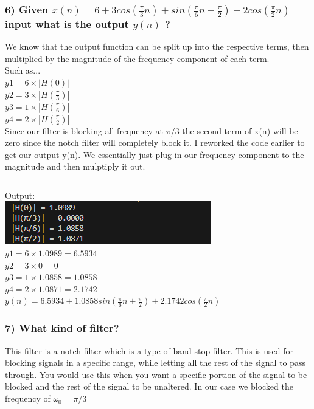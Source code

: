 \documentclass[12pt,letterpaper]{article}
\begin{document}
\subsubsection*{6) Given $x(n) = 6 + 3 cos(\frac{\pi}{3}n) + sin(\frac{\pi}{6}n + \frac{\pi}{2}) + 2 cos(\frac{\pi}{2}n)$  input what is the output $y(n)$ ? }
We know that the output function can be split up into the respective terms, then multiplied by the magnitude of the frequency component of each term.\\
Such as...\\
$y1 = 6 \times |H(0)|$ \\
$y2 = 3 \times |H(\frac{\pi}{3})|$ \\
$y3 = 1 \times |H(\frac{\pi}{6})|$ \\ 
$y4 = 2 \times |H(\frac{\pi}{2})|$ \\
Since our filter is blocking all frequency at $\pi/3$ the second term of x(n) will be zero since the notch filter will completely block it. I reworked the code earlier to get our output y(n). We essentially just plug in our frequency component to the magnitude and then mulptiply it out.
\inputminted[frame=lines,framesep=2mm,baselinestretch=1.2,bgcolor=LightGray,breaklines,fontsize=\tiny,linenos]{python}{p1p6.py}
Output:\\
\includegraphics*[scale=1]{p1p6.png} \\
$y1 = 6 \times 1.0989 = 6.5934$ \\
$y2 = 3 \times 0 = 0$ \\
$y3 = 1 \times 1.0858 = 1.0858$ \\ 
$y4 = 2 \times 1.0871 = 2.1742$ \\
$y(n) = 6.5934 + 1.0858 sin(\frac{\pi}{6} n + \frac{\pi}{2}) + 2.1742 cos(\frac{\pi}{2} n)$

\subsubsection*{7) What kind of filter?}
This filter is a notch filter which is a type of band stop filter. This is used for blocking signals in a specific range, while letting all the rest of the signal to pass through. You would use this when you want a specific portion of the signal to be blocked and the rest of the signal to be unaltered. In our case we blocked the frequency of $\omega_0 = \pi/3$
\end{document}
